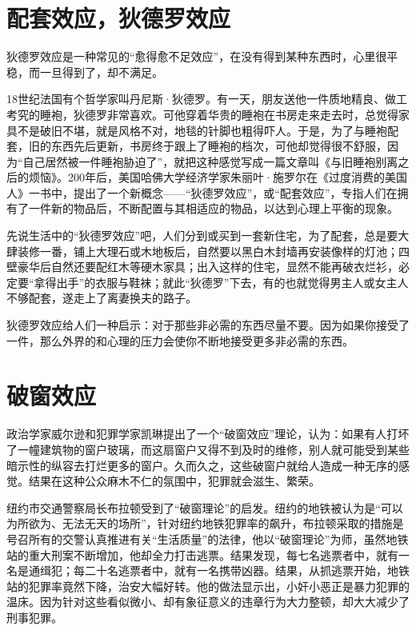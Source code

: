 \documentclass[11pt]{ctexart}
\begin{document}
\section{配套效应，狄德罗效应}
\label{sec-78}


狄德罗效应是一种常见的“愈得愈不足效应”，在没有得到某种东西时，心里很平稳，而一旦得到了，却不满足。

18世纪法国有个哲学家叫丹尼斯·狄德罗。有一天，朋友送他一件质地精良、做工考究的睡袍，狄德罗非常喜欢。可他穿着华贵的睡袍在书房走来走去时，总觉得家具不是破旧不堪，就是风格不对，地毯的针脚也粗得吓人。于是，为了与睡袍配套，旧的东西先后更新，书房终于跟上了睡袍的档次，可他却觉得很不舒服，因为“自己居然被一件睡袍胁迫了”，就把这种感觉写成一篇文章叫《与旧睡袍别离之后的烦恼》。200年后，美国哈佛大学经济学家朱丽叶·施罗尔在《过度消费的美国人》一书中，提出了一个新概念——“狄德罗效应”，或“配套效应”，专指人们在拥有了一件新的物品后，不断配置与其相适应的物品，以达到心理上平衡的现象。

先说生活中的“狄德罗效应”吧，人们分到或买到一套新住宅，为了配套，总是要大肆装修一番，铺上大理石或木地板后，自然要以黑白木封墙再安装像样的灯池；四壁豪华后自然还要配红木等硬木家具；出入这样的住宅，显然不能再破衣烂衫，必定要“拿得出手”的衣服与鞋袜；就此“狄德罗”下去，有的也就觉得男主人或女主人不够配套，遂走上了离妻换夫的路子。

狄德罗效应给人们一种启示：对于那些非必需的东西尽量不要。因为如果你接受了一件，那么外界的和心理的压力会使你不断地接受更多非必需的东西。
\section{破窗效应}
\label{sec-79}


政治学家威尔逊和犯罪学家凯琳提出了一个“破窗效应”理论，认为：如果有人打坏了一幢建筑物的窗户玻璃，而这扇窗户又得不到及时的维修，别人就可能受到某些暗示性的纵容去打烂更多的窗户。久而久之，这些破窗户就给人造成一种无序的感觉。结果在这种公众麻木不仁的氛围中，犯罪就会滋生、繁荣。

纽约市交通警察局长布拉顿受到了“破窗理论”的启发。纽约的地铁被认为是“可以为所欲为、无法无天的场所”，针对纽约地铁犯罪率的飙升，布拉顿采取的措施是号召所有的交警认真推进有关“生活质量”的法律，他以“破窗理论”为师，虽然地铁站的重大刑案不断增加，他却全力打击逃票。结果发现，每七名逃票者中，就有一名是通缉犯；每二十名逃票者中，就有一名携带凶器。结果，从抓逃票开始，地铁站的犯罪率竟然下降，治安大幅好转。他的做法显示出，小奸小恶正是暴力犯罪的温床。因为针对这些看似微小、却有象征意义的违章行为大力整顿，却大大减少了刑事犯罪。
\end{document}
